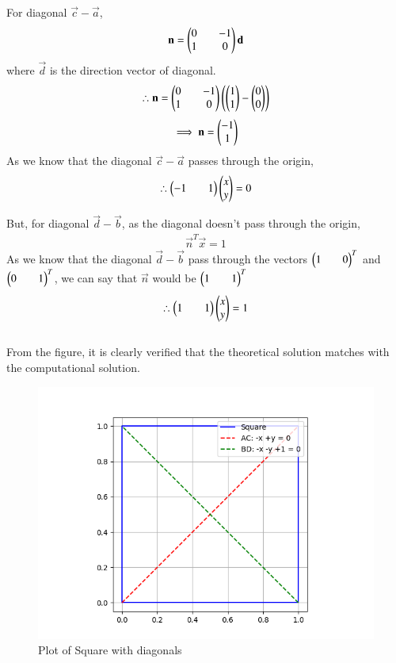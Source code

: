 \documentclass[journal]{IEEEtran}
\begin{document}
For diagonal $\vec{c}-\vec{a}$,
\begin{align*}
    \mathbf{n}=\begin{pmatrix}0&&-1\\1&&0\end{pmatrix}\mathbf{d}
\end{align*}
where $\vec{d}$ is the direction vector of diagonal.
\begin{align*}
    \therefore \mathbf{n}=\begin{pmatrix}0&&-1\\1&&0\end{pmatrix}\left(\begin{pmatrix}1\\1\end{pmatrix}-\begin{pmatrix}0\\0\end{pmatrix}\right)
\end{align*}
\begin{align*}
    \implies \mathbf{n}=\begin{pmatrix}-1\\1\end{pmatrix}
\end{align*}
As we know that the diagonal $\vec{c}-\vec{a}$ passes through the origin,
\begin{align*}
    \therefore \begin{pmatrix}-1&&1\end{pmatrix}\begin{pmatrix}x\\y\end{pmatrix}=0
\end{align*}
\newpage
\vspace*{0.25cm}

But, for diagonal $\vec{d}-\vec{b}$, as the diagonal doesn't pass through the origin,
\begin{align*}
    \vec{n}^T\vec{x}=1
\end{align*}
As we know that the diagonal $\vec{d}-\vec{b}$ pass through the vectors $\begin{pmatrix}1&&0\end{pmatrix}^T$ and $\begin{pmatrix}0&&1\end{pmatrix}^T$, we can say that $\vec{n}$ would be $\begin{pmatrix}1&&1\end{pmatrix}^T$ 
\begin{align*}
    \therefore \begin{pmatrix}1&&1\end{pmatrix}\begin{pmatrix}x\\y\end{pmatrix}=1
\end{align*}
\\
From the figure, it is clearly verified that the theoretical solution matches with the computational solution.\\
\begin{figure}[H]
    \centering
    \includegraphics[width=0.6\columnwidth]{figs/Figure_1.png}
    \caption*{Plot of Square with diagonals}
    \label{fig:1}
\end{figure}
\end{document}
